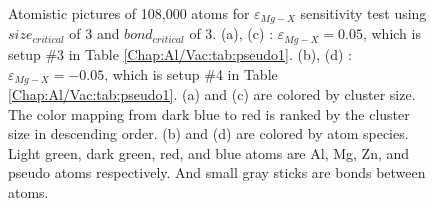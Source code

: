 \begin{figure}[!ht]
\caption[Atomistic pictures of 108,000 atoms for $\varepsilon_{Mg-X}$ sensitivity test.]{Atomistic pictures of 108,000 atoms for $\varepsilon_{Mg-X}$ sensitivity test using $size_{critical}$ of 3 and $bond_{critical}$ of 3. (a), (c) : $\varepsilon_{Mg-X} = 0.05$, which is setup \#3 in Table \ref{Chap:Al/Vac:tab:pseudo1}. (b), (d) : $\varepsilon_{Mg-X} = -0.05$, which is setup \#4 in Table \ref{Chap:Al/Vac:tab:pseudo1}. (a) and (c) are colored by cluster size. The color mapping from dark blue to red is ranked by the cluster size in descending order. (b) and (d) are colored by atom species. Light green, dark green, red, and blue atoms are Al, Mg, Zn, and pseudo atoms respectively. And small gray sticks are bonds between atoms.}
\label{Chap:Al/Vac:fig:sens_Mg}
\end{figure}
\endgroup



